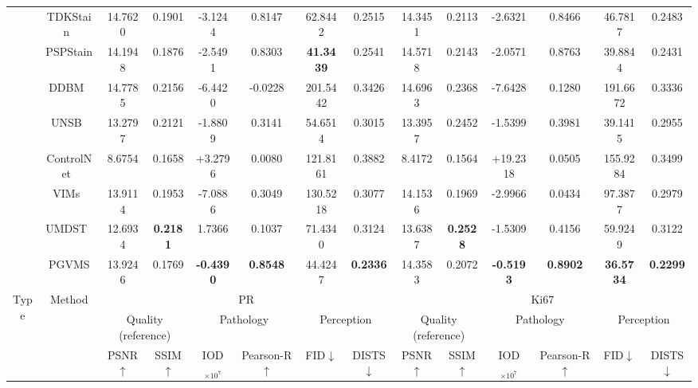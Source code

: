 \documentclass[journal,twoside,web]{ieeecolor}
\begin{document}
\begin{table}[ht]
{\begin{tabular}{c|c|cc|cc|cc|cc|cc|cc}
      & TDKStain~\cite{peng2024advancing} &
      14.7620 & 0.1901 & -3.1244 & 0.8147 & 62.8442 & 0.2515 & 
      14.3451 & 0.2113 & -2.6321 & 0.8466 & 46.7817 & 0.2483 \\
      
      & PSPStain~\cite{chen2024pathological} & 
      14.1948 & 0.1876 & -2.5491 & 0.8303 & \textbf{41.3439} & 0.2541 & 
      14.5718 & 0.2143 & -2.0571 & 0.8763 & 39.8844 & 0.2431 \\

      & DDBM~\cite{zhou2023denoising} &
      14.7785 & 0.2156 & -6.4420 & -0.0228 & 201.5442 & 0.3426 &
      14.6963 & 0.2368 & -7.6428 & 0.1280 & 191.6672 & 0.3336 \\
      
      & UNSB~\cite{kim2023unpaired} &
      13.2797 & 0.2121 & -1.8809 & 0.3141 & 54.6514 & 0.3015 &
      13.3957 & 0.2452 & -1.5399 & 0.3981 & 39.1415 & 0.2955 \\
      
      
      \Xhline{0.8pt}
      \rowcolor{gray!10}
    & \cellcolor{gray!10}ControlNet~\cite{zhang2023adding} &
    8.6754 & 0.1658 & +3.2796 & 0.0080 & 121.8161 & 0.3882 &
    8.4172 & 0.1564 & +19.2318 & 0.0505 & 155.9284 & 0.3499 \\
    \rowcolor{gray!10}
    & \cellcolor{gray!10}VIMs~\cite{dubey2024vims} & 
    13.9114 & 0.1953 & -7.0886 & 0.3049 & 130.5218 & 0.3077 &
    14.1536 & 0.1969 & -2.9966 & 0.0434 & 97.3877 & 0.2979 \\
    \rowcolor{gray!10}
    & \cellcolor{gray!10}UMDST~\cite{lin2022unpaired} & 
    12.6934 & \textbf{0.2181} & 1.7366 & 0.1037 & 71.4340 & 0.3124 &
    13.6387 & \textbf{0.2528} & -1.5309 & 0.4156 & 59.9249 & 0.3122 \\
   
    \rowcolor{gray!10}
   \multirow{-4}{*}{One-to-many}  & \cellcolor{gray!10}PGVMS & 
    13.9246 & 0.1769 & \textbf{-0.4390} & \textbf{0.8548} & 44.4247 & \textbf{0.2336} &
    14.3583 & 0.2072 & \textbf{-0.5193} & \textbf{0.8902} & \textbf{36.5734} & \textbf{0.2299} \\

      \hline
      \multirow{3}{*}{Type} & 
      \multirow{3}{*}{Method} & 
      \multicolumn{6}{c|}{PR} & \multicolumn{6}{c}{Ki67} \\
      \cline{3-14}
      & & \multicolumn{2}{c|}{Quality (reference)} & \multicolumn{2}{c|}{Pathology} & \multicolumn{2}{c|}{Perception} & 
      \multicolumn{2}{c|}{Quality (reference)} & \multicolumn{2}{c|}{Pathology} & \multicolumn{2}{c}{Perception} \\
      \cline{3-14}
      & & PSNR$\uparrow$ & SSIM$\uparrow$ & IOD$_{\times10^7}$ & Pearson-R$\uparrow$ & FID$\downarrow$  & DISTS$\downarrow$ 
      & PSNR$\uparrow$ & SSIM$\uparrow$ & IOD$_{\times10^7}$ & Pearson-R$\uparrow$ & FID$\downarrow$ & DISTS$\downarrow$ \\
      \hline
      

\end{tabular}}
\end{table}
\end{document}
